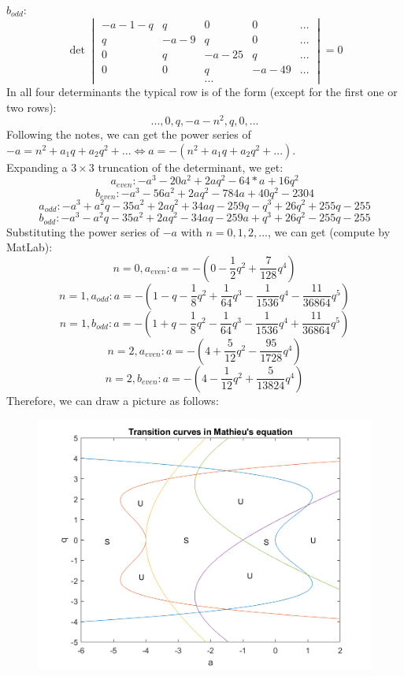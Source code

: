 \documentclass{article}
\begin{document}
$b_{odd}:$
$$\det{\begin{vmatrix} -a-1-q&q&0&0&...\\
q&-a-9&q&0&...\\
0&q&-a-25&q&...\\
0&0&q&-a-49&...\\
& & ... & & \end{vmatrix}} = 0$$
In all four determinants the typical row is of the form (except for the first one or two rows):
$$..., 0, q, -a-n^2, q, 0, ...$$
Following the notes, we can get the power series of $-a = n^2 + a_1 q + a_2 q^2 + ... \Longleftrightarrow a = -(n^2 + a_1 q + a_2 q^2 + ...)$. \\
Expanding a $3 \times 3$ truncation of the determinant, we get:
$$a_{even}: -a^3 - 20 a^2 + 2 a q^2 - 64*a + 16 q^2$$
$$b_{even}: -a^3 - 56 a^2 + 2 a q^2 - 784 a + 40 q^2 -2304$$
$$a_{odd}: -a^3 + a^2 q - 35 a^2 + 2 a q^2 + 34 a q - 259 q - q^3 + 26q^2 + 255 q -255$$
$$b_{odd}: -a^3 - a^2 q - 35 a^2 + 2 a q^2 -34 a q - 259 a + q^3 + 26 q^2 -255 q -255$$
Substituting the power series of $-a$ with $n = 0, 1, 2, ...$, we can get (compute by MatLab):
$$n=0, a_{even}: a = -(0-\frac{1}{2} q^2 + \frac{7}{128} q^4)$$
$$n=1, a_{odd}: a = -(1-q - \frac{1}{8} q^2 + \frac{1}{64} q^3 - \frac{1}{1536}q^4 - \frac{11}{36864}q^5)$$
$$n=1, b_{odd}: a = -(1+q - \frac{1}{8} q^2 - \frac{1}{64} q^3 - \frac{1}{1536}q^4 + \frac{11}{36864}q^5)$$
$$n=2, a_{even}: a = -(4+\frac{5}{12} q^2 - \frac{95}{1728} q^4)$$
$$n=2, b_{even}: a = -(4-\frac{1}{12} q^2 + \frac{5}{13824} q^4)$$
Therefore, we can draw a picture as follows:
\begin{figure}[h!]
\centering
\includegraphics[width=0.6\linewidth]{Part_B_Result.png}
\end{figure}
\end{document}
